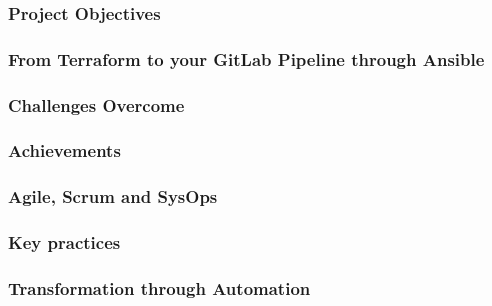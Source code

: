 \documentclass{beamer}
\begin{document}
\begin{frame}
\frametitle{Project Objectives}
\end{frame}

\begin{frame}
\frametitle{From Terraform to your GitLab Pipeline through Ansible}
\end{frame}

\begin{frame}
\frametitle{Challenges Overcome}
\end{frame}

\begin{frame}
\frametitle{Achievements}
\end{frame}

\begin{frame}
\frametitle{Agile, Scrum and SysOps}
\end{frame}

\begin{frame}
\frametitle{Key practices}
\end{frame}

\begin{frame}
\frametitle{Transformation through Automation}
\end{frame}
\end{document}
